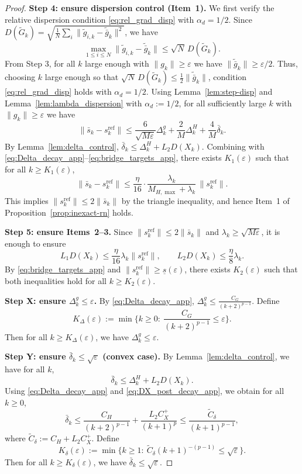 \documentclass[review,onefignum,onetabnum]{siamart171218}
\begin{document}
\begin{proof}
\smallskip
\noindent\textbf{Step 4: ensure dispersion control (Item~1).}
We first verify the relative dispersion condition \eqref{eq:rel_grad_disp} with $\alpha_d=1/2$.
Since $D(\tilde G_k)=\sqrt{\frac1N\sum_i\|\tilde g_{i,k}-\tilde{\bar g}_k\|^2}$, we have
\[
\max_{1\le i\le N}\|\tilde g_{i,k}-\tilde{\bar g}_k\|
\le \sqrt{N}\,D(\tilde G_k).
\]
From Step 3, for all $k$ large enough with $\|g_k\|\ge \varepsilon$ we have $\|\tilde{\bar g}_k\|\ge \varepsilon/2$.
Thus, choosing $k$ large enough so that $\sqrt N\,D(\tilde G_k)\le \frac12\|\tilde{\bar g}_k\|$,
condition \eqref{eq:rel_grad_disp} holds with $\alpha_d=1/2$.
Using Lemma~\ref{lem:step-disp} and Lemma~\ref{lem:lambda_dispersion} with $\alpha_d:=1/2$,
for all sufficiently large $k$ with $\|g_k\|\ge \varepsilon$ we have
\[
\|\bar s_k-s_k^{\mathrm{ref}}\|
\le \frac{6}{\sqrt{M\varepsilon}}\Delta_k^g+\frac{2}{M}\Delta_k^H+\frac{4}{M}\bar\delta_k.
\]
By Lemma~\ref{lem:delta_control}, $\bar\delta_k\le \Delta_k^H+L_2D(X_k)$.
Combining with \eqref{eq:Delta_decay_app}--\eqref{eq:bridge_targets_app}, there exists $K_1(\varepsilon)$ such that for all $k\ge K_1(\varepsilon)$,
\[
\|\bar s_k-s_k^{\mathrm{ref}}\|\le \frac{\eta}{16}\cdot \frac{\lambda_k}{M_{H,\max}+\lambda_k}\,\|s_k^{\mathrm{ref}}\|.
\]
This implies $\|s_k^{\mathrm{ref}}\|\le 2\|\bar s_k\|$ by the triangle inequality, and hence Item~1 of Proposition~\ref{prop:inexact-rn} holds.

\smallskip
\noindent\textbf{Step 5: ensure Items~2--3.}
Since $\|s_k^{\mathrm{ref}}\|\le 2\|\bar s_k\|$ and $\lambda_k\ge \sqrt{M\varepsilon}$, it is enough to ensure
\[
L_1D(X_k)\le \frac{\eta}{16}\lambda_k\|s_k^{\mathrm{ref}}\|,
\qquad
L_2D(X_k)\le \frac{\eta}{8}\lambda_k.
\]
By \eqref{eq:bridge_targets_app} and $\|s_k^{\mathrm{ref}}\|\ge \underline s(\varepsilon)$, there exists $K_2(\varepsilon)$ such that both inequalities hold for all $k\ge K_2(\varepsilon)$.

\smallskip
\noindent\textbf{Step X: ensure $\Delta_k^g\le \varepsilon$.}
By \eqref{eq:Delta_decay_app}, $\Delta_k^g\le \frac{C_G}{(k+2)^{p-1}}$.
Define
\[
K_\Delta(\varepsilon):=\min\Big\{k\ge 0:\ \frac{C_G}{(k+2)^{p-1}}\le \varepsilon\Big\}.
\]
Then for all $k\ge K_\Delta(\varepsilon)$, we have $\Delta_k^g\le \varepsilon$.

\smallskip
\noindent\textbf{Step Y: ensure $\bar\delta_k\le \sqrt{\varepsilon}$ (convex case).}
By Lemma~\ref{lem:delta_control}, we have for all $k$,
\[
\bar\delta_k\le \Delta_k^H + L_2D(X_k).
\]
Using \eqref{eq:Delta_decay_app} and \eqref{eq:DX_post_decay_app}, we obtain for all $k\ge 0$,
\[
\bar\delta_k
\le \frac{C_H}{(k+2)^{p-1}}+\frac{L_2C_X^{+}}{(k+1)^p}
\le \frac{\widetilde C_\delta}{(k+1)^{p-1}},
\]
where $\widetilde C_\delta:=C_H+L_2C_X^{+}$.
Define
\[
K_\delta(\varepsilon):=\min\Big\{k\ge 1:\ \widetilde C_\delta (k+1)^{-(p-1)}\le \sqrt{\varepsilon}\Big\}.
\]
Then for all $k\ge K_\delta(\varepsilon)$, we have $\bar\delta_k\le \sqrt{\varepsilon}$.


\end{proof}
\end{document}
